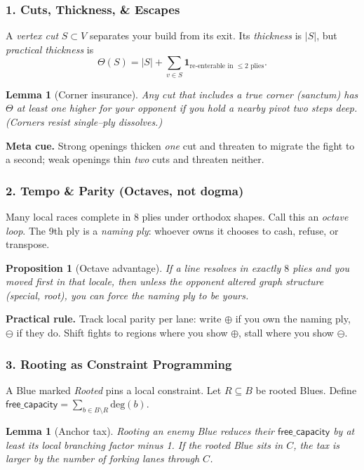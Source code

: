 \documentclass[11pt]{article}
\numberwithin{equation}{section} %
\theoremstyle{plain} %
\newtheorem{lemma}[theorem]{Lemma}
\newtheorem{proposition}[theorem]{Proposition}
\theoremstyle{definition} %
\theoremstyle{remark} %
\begin{document}
\subsubsection{1. Cuts, Thickness, \& Escapes}
\label{ael-core:cuts}
A \emph{vertex cut} \(S\subset V\) separates your build from its exit. Its \emph{thickness} is \(|S|\), but \emph{practical thickness} is 
\[
\Theta(S)= |S| + \sum_{v\in S}\mathbf{1}_{\text{re-enterable in }\le 2\text{ plies}}.
\]
\begin{lemma}[Corner insurance]
Any cut that includes a true corner (sanctum) has \(\Theta\) at least one higher for your opponent if you hold a nearby pivot two steps deep. (Corners resist single–ply dissolves.)
\end{lemma}

\noindent\textbf{Meta cue.} Strong openings thicken \emph{one} cut and threaten to migrate the fight to a second; weak openings thin \emph{two} cuts and threaten neither.

\subsubsection{2. Tempo \& Parity (Octaves, not dogma)}
\label{ael-core:parity}
Many local races complete in \(8\) plies under orthodox shapes. Call this an \emph{octave loop}. The 9th ply is a \emph{naming ply}: whoever owns it chooses to cash, refuse, or transpose.

\begin{proposition}[Octave advantage]
If a line resolves in exactly \(8\) plies and you moved first in that locale, then unless the opponent altered graph structure (special, root), you can force the naming ply to be \emph{yours}. 
\end{proposition}

\noindent\textbf{Practical rule.} Track local parity per lane: write \(\oplus\) if you own the naming ply, \(\ominus\) if they do. Shift fights to regions where you show \(\oplus\), stall where you show \(\ominus\).

\subsubsection{3. Rooting as Constraint Programming}
\label{ael-core:root}
A Blue marked \emph{Rooted} pins a local constraint. Let \(R\subseteq B\) be rooted Blues. Define \(\mathsf{free\_capacity} = \sum_{b\in B\setminus R}\text{deg}(b)\). 

\begin{lemma}[Anchor tax]
Rooting an enemy Blue reduces their \(\mathsf{free\_capacity}\) by at least its local branching factor minus 1. If the rooted Blue sits in \(C\), the tax is larger by the number of forking lanes through \(C\).
\end{lemma}
\end{document}
